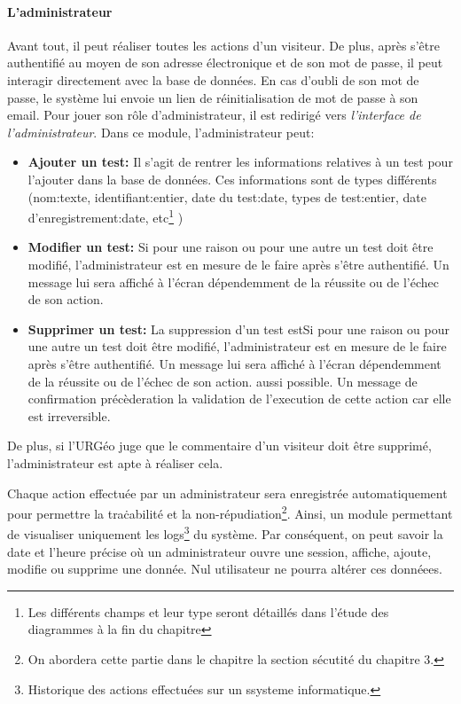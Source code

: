         \paragraph{L'administrateur}
        Avant tout, il peut réaliser toutes les actions d'un visiteur. De plus, après s'être authentifié au moyen de 
        son adresse électronique et de son mot de passe, il peut interagir directement avec la base de données. En cas 
        d'oubli de son mot de passe, le système lui envoie un lien de réinitialisation de mot de passe à son email.
        Pour jouer son rôle d'administrateur, il est redirigé vers \textit{l'interface de l'administrateur}. 
        Dans ce module, l'administrateur peut:
        \begin{itemize}
                \item \textbf{Ajouter un test: }
                Il s'agit de rentrer les informations relatives à un test pour l'ajouter dans la base de données.
                Ces informations sont de types différents (nom:texte, identifiant:entier, date du test:date, types
                de test:entier, date d'enregistrement:date, etc\footnote{Les différents champs et leur type seront 
                détaillés dans l'étude des diagrammes à la fin du chapitre} )
                \item \textbf{Modifier un test: }
                Si pour une raison ou pour une autre un test doit être modifié, l'administrateur est en
                mesure de le faire après s'être authentifié. Un message lui sera affiché à l'écran dépendemment 
                de la réussite ou de l'échec de son action.
                \item \textbf{Supprimer un test: }
                La suppression d'un test estSi pour une raison ou pour une autre un test doit être modifié, l'administrateur est en
                mesure de le faire après s'être authentifié. Un message lui sera affiché à l'écran dépendemment 
                de la réussite ou de l'échec de son action. aussi possible. Un message de confirmation précèderation la validation
                de l'execution de cette action car elle est irreversible.
        \end{itemize}
        \par
        De plus, si l'URGéo juge que le commentaire d'un visiteur doit être supprimé,
        l'administrateur est apte à réaliser cela.
        \par
        Chaque action effectuée par un administrateur sera enregistrée automatiquement pour permettre la traċabilité
        et la non-répudiation\footnote{On abordera cette partie dans le chapitre la section sécutité du chapitre 3.}.
        Ainsi, un module permettant de visualiser uniquement les logs\footnote{Historique des actions effectuées sur un ssysteme informatique.} du système. Par conséquent, on peut savoir
        la date et l'heure précise où un administrateur ouvre une session, affiche, ajoute, modifie ou supprime une donnée.
        Nul utilisateur ne pourra altérer ces donnéees.
        \par

